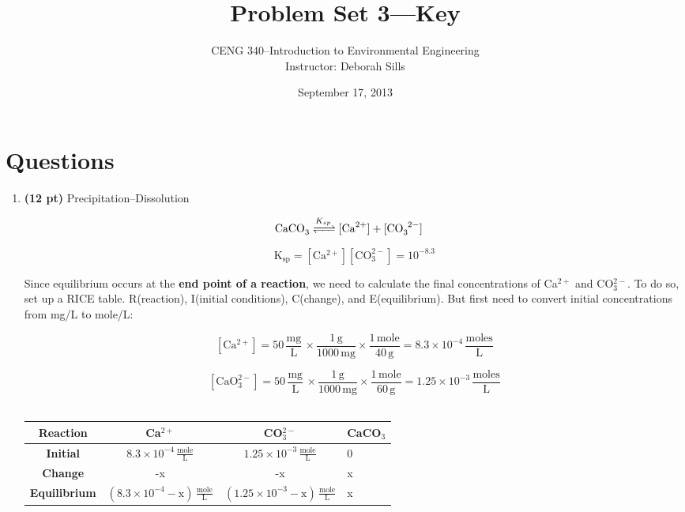 \documentclass[12pt,letterpaper]{article}
\begin{document}
\setlength{\parindent}{0cm} 


\frenchspacing

\title {Problem Set 3---Key} 
\author {CENG 340--Introduction to Environmental Engineering\\
Instructor: Deborah Sills}
\date {September 17, 2013}
\maketitle



\section *{Questions}
\begin{enumerate}
\item \textbf{(12 pt)}  Precipitation--Dissolution

\begin{align*}
\cee{CaCO_3 &<=>[K_{sp}] [Ca^{2+}] + [CO_3^{2-}]} 
\end{align*}

\begin{equation*}
\mathrm{K_{sp} = [Ca^{2+}][CO_3^{2-}]= 10^{-8.3}}
\end{equation*}

Since equilibrium occurs at the \textbf{end point of a reaction}, we need to calculate the final concentrations of Ca$^{2+}$ and CO$_3^{2-}$. To do so, set up a RICE table.  R(reaction), I(initial conditions), C(change), and E(equilibrium).  But first need to convert initial concentrations from mg/L to mole/L:

\begin{equation*}
\mathrm{ [Ca^{2+}] = 50\, \frac{mg}{L}\, \times \frac{1\, g}{1000\, mg}\times \frac{1\, mole}{40\, g} = 8.3\times 10^{-4}\, \frac{moles}{L}}
\end{equation*}

\begin{equation*}
\mathrm{ [CaO_3^{2-}] = 50\, \frac{mg}{L}\, \times \frac{1\, g}{1000\, mg}\times \frac{1\, mole}{60\, g} = 1.25\times 10^{-3}\, \frac{moles}{L}}
\end{equation*}\\



\begin{minipage}{\linewidth}
\centering
{} \label{tab:title}

\begin{tabular}{|c|c|c|p{3.1cm}|}\toprule[1.25pt]
\bf {R}eaction & \bf Ca$^{2+}$	& \bf CO$_3^{2-}$	& \bf CaCO$_3$\\\midrule
\bf{I}nitial	&  $\mathrm{8.3\times 10^{-4}\, \frac{mole}{L}}$	& $\mathrm{1.25\times 10^{-3}\, \frac{mole}{L}}$ & 0\\ \hline
\bf{C}hange	& -x 	& -x	& x\\ \hline
\bf{E}quilibrium & $\mathrm{(8.3\times 10^{-4} - x)\, \frac{mole}{L}}$	& $\mathrm{(1.25\times 10^{-3} -x)\, \frac{mole}{L}}$	&  x\\  \hline


\end{tabular}
\end{minipage}
\end{enumerate}
\end{document}
